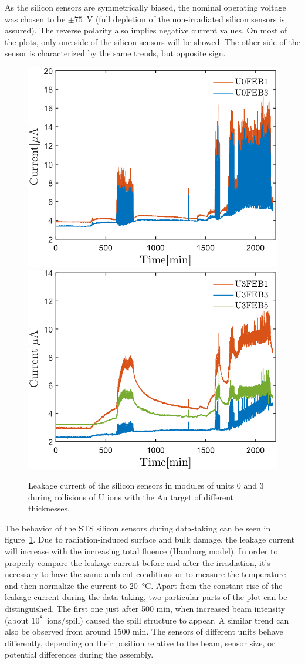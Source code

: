 As the silicon sensors are symmetrically biased, the nominal operating voltage was chosen to be $\pm75$~V (full depletion of the non-irradiated silicon sensors is assured). The reverse polarity also implies negative current values. On most of the plots, only one side of the silicon sensors will be showed. The other side of the sensor is characterized by the same trends, but opposite sign.

\begin{figure}[!h]
\centering
\includegraphics[width=0.45\columnwidth]{Chapter6/DCS/images/uranium/U0.png}
\includegraphics[width=0.45\columnwidth]{Chapter6/DCS/images/uranium/U3.png}
\caption{Leakage current of the silicon sensors in modules of units 0 and 3 during collisions of U ions with the Au target of different thicknesses.}
\label{fig_msts_LC}
\end{figure}

The behavior of the \gls{STS} silicon sensors during data-taking can be seen in figure~\ref{fig_msts_LC}. Due to radiation-induced surface and bulk damage, the leakage current will increase with the increasing total fluence (Hamburg model). In order to properly compare the leakage current before and after the irradiation, it's necessary to have the same ambient conditions or to measure the temperature and then normalize the current to \SI{20}{\celsius}. Apart from the constant rise of the leakage current during the data-taking, two particular parts of the plot can be distinguished. The first one just after 500 min, when increased beam intensity (about $10^{8}$~ions/spill) caused the spill structure to appear. A similar trend can also be observed from around 1500 min. The sensors of different units behave differently, depending on their position relative to the beam, sensor size, or potential differences during the assembly.


